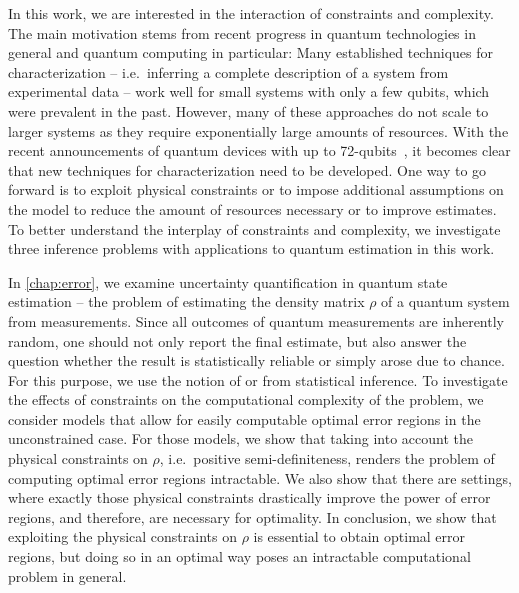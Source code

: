In this work, we are interested in the interaction of constraints and complexity.
The main motivation stems from recent progress in quantum technologies in general and quantum computing in particular:
Many established techniques for characterization -- i.e.\ inferring a complete description of a system from experimental data -- work well for small systems with only a few qubits, which were prevalent in the past.
However, many of these approaches do not scale to larger systems as they require exponentially large amounts of resources.
With the recent announcements of quantum devices with up to 72-qubits~\cite{ConoverGooglemovesquantum2018}, it becomes clear that new techniques for characterization need to be developed.
One way to go forward is to exploit physical constraints or to impose additional assumptions on the model to reduce the amount of resources necessary or to improve estimates.
To better understand the interplay of constraints and complexity, we investigate three inference problems with applications to quantum estimation in this work.

In \cref{chap:error}, we examine uncertainty quantification in quantum state estimation -- the problem of estimating the density matrix $\rho$ of a quantum system from measurements.
Since all outcomes of quantum measurements are inherently random, one should not only report the final estimate, but also answer the question whether the result is statistically reliable or simply arose due to chance.
For this purpose, we use the notion of  or  from statistical inference.
To investigate the effects of constraints on the computational complexity of the problem, we consider models that allow for easily computable optimal error regions in the unconstrained case.
For those models, we show that taking into account the physical constraints on $\rho$, i.e.\ positive semi-definiteness, renders the problem of computing optimal error regions intractable.
We also show that there are settings, where exactly those physical constraints drastically improve the power of error regions, and therefore, are necessary for optimality.
In conclusion, we show that exploiting the physical constraints on $\rho$ is essential to obtain optimal error regions, but doing so in an optimal way poses an intractable computational problem in general.

